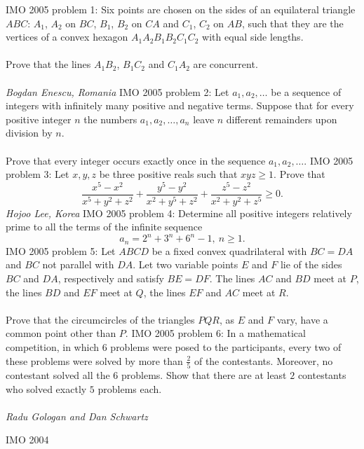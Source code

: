 IMO 2005 problem 1:  Six points are  chosen on the sides of an equilateral triangle $ABC$: $A_1$, $A_2$ on $BC$, $B_1$, $B_2$ on $CA$ and $C_1$, $C_2$ on $AB$, such that they are the vertices of a convex hexagon $A_1A_2B_1B_2C_1C_2$ with equal side lengths. \\\\
Prove that the lines $A_1B_2$, $B_1C_2$ and $C_1A_2$ are concurrent. \\\\
\textit{Bogdan Enescu, Romania} 
IMO 2005 problem 2:  Let $a_1,a_2,\ldots$ be a sequence of integers with infinitely many positive and negative terms. Suppose that for every positive integer $n$ the numbers $a_1,a_2,\ldots,a_n$ leave $n$ different remainders upon division by $n$. \\\\
Prove that every integer occurs exactly once in the sequence $a_1,a_2,\ldots$. 
IMO 2005 problem 3:  Let $x,y,z$ be three positive reals such that $xyz\geq 1$. Prove that
\[
\frac { x^5-x^2 }{x^5+y^2+z^2} + \frac {y^5-y^2}{x^2+y^5+z^2} + \frac {z^5-z^2}{x^2+y^2+z^5} \geq 0 .
\]
\textit{Hojoo Lee, Korea} 
IMO 2005 problem 4:  Determine all positive integers relatively prime to all the terms of the infinite sequence
\[ a_n=2^n+3^n+6^n -1,\ n\geq 1. \] 
IMO 2005 problem 5:  Let $ABCD$ be a fixed convex quadrilateral with $BC=DA$ and $BC$ not parallel with $DA$. Let two variable points $E$ and $F$ lie of the sides $BC$ and $DA$, respectively and satisfy $BE=DF$. The lines $AC$ and $BD$ meet at $P$, the lines $BD$ and $EF$ meet at $Q$, the lines $EF$ and $AC$ meet at $R$. \\\\
Prove that the circumcircles of the triangles $PQR$, as $E$ and $F$ vary, have a common point other than $P$. 
IMO 2005 problem 6:  In a mathematical competition, in which $6$ problems were posed to the participants, every two of these problems were solved by more than $\frac 25$ of the contestants. Moreover, no contestant solved all the $6$ problems. Show that there are at least $2$ contestants who solved exactly $5$ problems each. \\\\
\textit{Radu Gologan and Dan Schwartz} 

IMO 2004 


